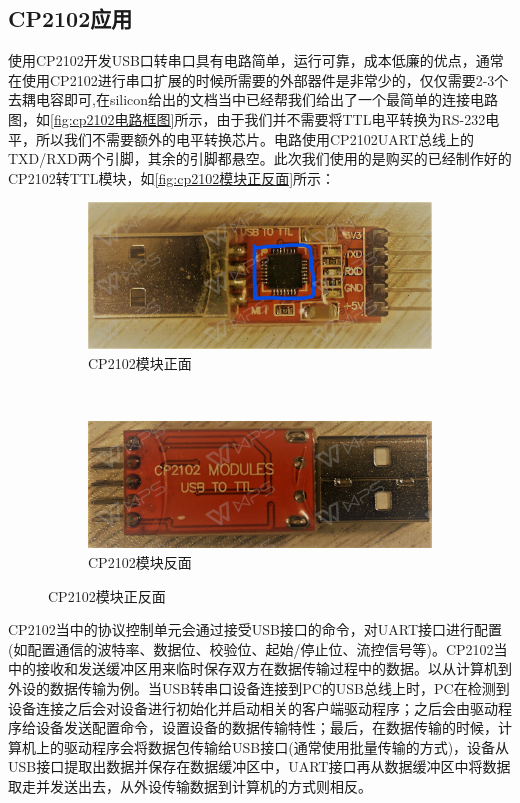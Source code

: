 \subsection{CP2102应用}
	使用CP2102开发USB口转串口具有电路简单，运行可靠，成本低廉的优点，通常在使用CP2102进行串口扩展的时候所需要的外部器件是非常少的，仅仅需要2-3个去耦电容即可,在silicon给出的文档当中已经帮我们给出了一个最简单的连接电路图，如\autoref{fig:cp2102电路框图}所示，由于我们并不需要将TTL电平转换为RS-232电平，所以我们不需要额外的电平转换芯片。电路使用CP2102UART总线上的TXD/RXD两个引脚，其余的引脚都悬空。此次我们使用的是购买的已经制作好的CP2102转TTL模块，如\autoref{fig:cp2102模块正反面}所示：
\begin{figure}[h]
\centering
  \begin{subfigure}[b]{0.4\textwidth}
  \includegraphics[width=\textwidth]{./graphics/cp2102Front.pdf}
  \caption{CP2102模块正面}\label{fig:cp2102Front}
  \end{subfigure}
  ~
  \begin{subfigure}[b]{0.4\textwidth}
  \includegraphics[width=\textwidth]{./graphics/cp2102Rear.pdf}
  \caption{CP2102模块反面}\label{fig:cp2102Rear}
  \end{subfigure}
\caption{CP2102模块正反面}\label{fig:cp2102模块正反面}
\end{figure}

CP2102当中的协议控制单元会通过接受USB接口的命令，对UART接口进行配置(如配置通信的波特率、数据位、校验位、起始/停止位、流控信号等)。CP2102当中的接收和发送缓冲区用来临时保存双方在数据传输过程中的数据。以从计算机到外设的数据传输为例。当USB转串口设备连接到PC的USB总线上时，PC在检测到设备连接之后会对设备进行初始化并启动相关的客户端驱动程序；之后会由驱动程序给设备发送配置命令，设置设备的数据传输特性；最后，在数据传输的时候，计算机上的驱动程序会将数据包传输给USB接口(通常使用批量传输的方式)，设备从USB接口提取出数据并保存在数据缓冲区中，UART接口再从数据缓冲区中将数据取走并发送出去，从外设传输数据到计算机的方式则相反。

